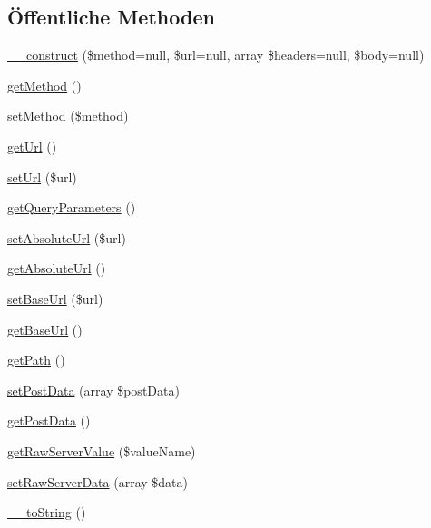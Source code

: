 \subsection*{Öffentliche Methoden}
\begin{DoxyCompactItemize}
\item 
\mbox{\hyperlink{class_sabre_1_1_h_t_t_p_1_1_request_ad69558c4121093b56722cfc587f0118c}{\+\_\+\+\_\+construct}} (\$method=null, \$url=null, array \$headers=null, \$body=null)
\item 
\mbox{\hyperlink{class_sabre_1_1_h_t_t_p_1_1_request_abdb8452dd585c99e63248dfe22a6d57d}{get\+Method}} ()
\item 
\mbox{\hyperlink{class_sabre_1_1_h_t_t_p_1_1_request_a1e8716f1a7f53cac328fdfbda42d35ed}{set\+Method}} (\$method)
\item 
\mbox{\hyperlink{class_sabre_1_1_h_t_t_p_1_1_request_a197522746cac4ff79480d292b8664f88}{get\+Url}} ()
\item 
\mbox{\hyperlink{class_sabre_1_1_h_t_t_p_1_1_request_abdd576a7f208efa8438967bac9422093}{set\+Url}} (\$url)
\item 
\mbox{\hyperlink{class_sabre_1_1_h_t_t_p_1_1_request_a2bf1d2de1af4871f761aa0f8a3b2d2cc}{get\+Query\+Parameters}} ()
\item 
\mbox{\hyperlink{class_sabre_1_1_h_t_t_p_1_1_request_a4dd2d55f5c3a458c113bbb499a92c6ae}{set\+Absolute\+Url}} (\$url)
\item 
\mbox{\hyperlink{class_sabre_1_1_h_t_t_p_1_1_request_a112af52e6293b735ac82a8c92f83d637}{get\+Absolute\+Url}} ()
\item 
\mbox{\hyperlink{class_sabre_1_1_h_t_t_p_1_1_request_afe2e7926b168b37dceec5b19668f1fb9}{set\+Base\+Url}} (\$url)
\item 
\mbox{\hyperlink{class_sabre_1_1_h_t_t_p_1_1_request_a959a5d2f95e4545290e419906c4e417a}{get\+Base\+Url}} ()
\item 
\mbox{\hyperlink{class_sabre_1_1_h_t_t_p_1_1_request_ab484327e7fcdadc5caca615eeb436cf8}{get\+Path}} ()
\item 
\mbox{\hyperlink{class_sabre_1_1_h_t_t_p_1_1_request_acb40e160bafcfe2d3899febda483db38}{set\+Post\+Data}} (array \$post\+Data)
\item 
\mbox{\hyperlink{class_sabre_1_1_h_t_t_p_1_1_request_ae81960877721a46ebe6fd90084a18a62}{get\+Post\+Data}} ()
\item 
\mbox{\hyperlink{class_sabre_1_1_h_t_t_p_1_1_request_abee040c0f5f18db19b5503c2c4f3379a}{get\+Raw\+Server\+Value}} (\$value\+Name)
\item 
\mbox{\hyperlink{class_sabre_1_1_h_t_t_p_1_1_request_aa14eebf681c465e6077432d06e14b404}{set\+Raw\+Server\+Data}} (array \$data)
\item 
\mbox{\hyperlink{class_sabre_1_1_h_t_t_p_1_1_request_af55bf27174ba5a8be9859f7566c8e16b}{\+\_\+\+\_\+to\+String}} ()
\end{DoxyCompactItemize}
